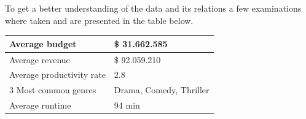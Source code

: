 To get a better understanding of the data and its relations a few examinations where taken and are presented in the table below.
\begin{center}
	\begin{tabular}{| l | l |}
	\hline
	Average budget & \$ 31.662.585 \\ \hline
	Average revenue & \$ 92.059.210 \\ \hline
	Average productivity rate & 2.8 \\ \hline
	3 Most common genres & Drama, Comedy, Thriller \\ \hline
	Average runtime & 94 min \\ \hline
	\end{tabular}
\end{center} 